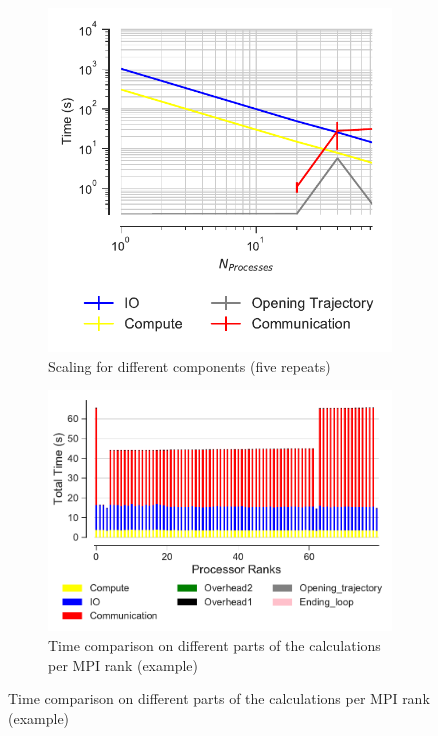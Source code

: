 \begin{figure}[ht!]
\begin{subfigure}{.4\textwidth}
  \includegraphics[width=\linewidth]{figures/main-RMSD-time_comp_IO_comparison-SuperMIC.pdf}
  \captionsetup{format=hang}
\caption{Scaling for different components (five repeats)}
\label{fig:ScalingComputeIO-SuperMIC}
\end{subfigure}
\hfill
\begin{subfigure} {.5\textwidth}
  \includegraphics[width=\linewidth]{figures/main-RMSD-BarPlot-rank-comparison_80_5-SuperMIC.pdf}
  \captionsetup{format=hang}
  \caption{Time comparison on different parts of the calculations per MPI rank (example)}
  \label{fig:MPIranks-SuperMIC}
\end{subfigure}


\end{figure}
